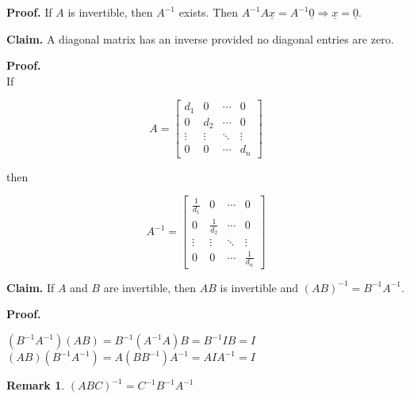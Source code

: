 \documentclass[12pt,a4paper]{article}
\newtheorem*{rem}{Remark}
\newcommand{\Remark}[1]{
  \begin{rem}
    \color{cyan}
    #1
  \end{rem}
}
\begin{document}
\textbf{Proof.} If $A$ is invertible, then $A^{-1}$ exists.
Then $A^{-1}A\underline{x} = A^{-1}\underline{0} \Rightarrow \underline{x} = \underline{0}$.

\textbf{Claim.} A diagonal matrix has an inverse provided no diagonal entries are zero.

\textbf{Proof.} \\
If

\[
A = \begin{bmatrix}
  d_1 & 0 & \cdots & 0 \\
  0 & d_2 & \cdots & 0 \\
  \vdots & \vdots & \ddots & \vdots \\
  0 & 0 & \cdots & d_n
\end{bmatrix}
\]

then

\[
A^{-1} = \begin{bmatrix}
  \frac{1}{d_1} & 0 & \cdots & 0 \\
  0 & \frac{1}{d_2} & \cdots & 0 \\
  \vdots & \vdots & \ddots & \vdots \\
  0 & 0 & \cdots & \frac{1}{d_n}
\end{bmatrix}
\]

\textbf{Claim.} If $A$ and $B$ are invertible, then $AB$ is invertible and $(AB)^{-1} = B^{-1}A^{-1}$.

\textbf{Proof.} 

$(B^{-1}A^{-1})(AB) = B^{-1}(A^{-1}A)B = B^{-1}IB = I$ \\
$(AB)(B^{-1}A^{-1}) = A(BB^{-1})A^{-1} = AIA^{-1} = I$

\Remark{$(ABC)^{-1} = C^{-1}B^{-1}A^{-1}$}
\end{document}
